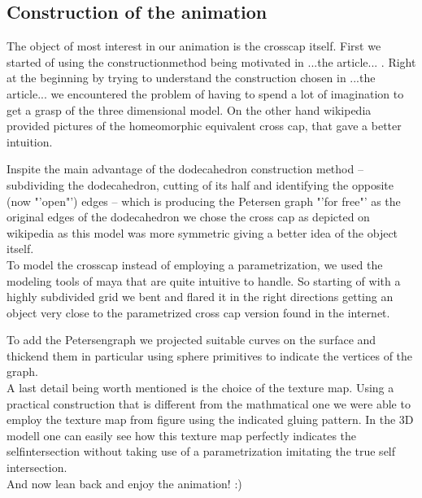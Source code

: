 \documentclass[11pt,            %
               a4paper,         %
               oneside,         %
               DIV12,           %
               fleqn,           %
               halfparskip,     %
               nochapterprefix, %
              ]{scrartcl} %
\theoremstyle{definition}
\begin{document}
\subsection{Construction of the animation}

The object of most interest in our animation is the crosscap itself. First we started of using the constructionmethod being motivated in ...the article... . Right at the beginning by trying to understand the construction chosen in ...the article... we encountered the problem of having to spend a lot of imagination to get a grasp of the three dimensional model. On the other hand wikipedia provided pictures of the homeomorphic equivalent cross cap, that gave a better intuition.

Inspite the main advantage of the dodecahedron construction method -- subdividing the dodecahedron, cutting of its half and identifying the opposite (now "'open"') edges -- which is producing the Petersen graph "'for free"' as the original edges of the dodecahedron we chose the cross cap as depicted on wikipedia as this model was more symmetric giving a better idea of the object itself. \\

To model the crosscap instead of employing a parametrization, we used the modeling tools of maya that are quite intuitive to handle. So starting of with a highly subdivided grid we bent and flared it in the right directions getting an object very close to the parametrized cross cap version found in the internet.

To add the Petersengraph we projected suitable curves on the surface and thickend them in particular using sphere primitives to indicate the vertices of the graph. \\

A last detail being worth mentioned is the choice of the texture map. Using a practical construction that is different from the mathmatical one we were able to employ the texture map from figure using the indicated gluing pattern. In the 3D modell one can easily see how this texture map perfectly indicates the selfintersection without taking use of a parametrization imitating the true self intersection. \\

And now lean back and enjoy the animation! :)


\newpage
\nocite{*}


\end{document}
